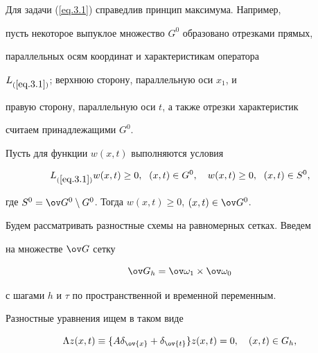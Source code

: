 Для задачи (\ref{eq.3.1}) справедлив принцип максимума. Например,


пусть некоторое выпуклое множество $G^0$ образовано отрезками прямых,


параллельных осям координат и характеристикам оператора


$L_{(\ref{eq.3.1})}$; верхнюю сторону, параллельную оси $x_1$, и


правую сторону, параллельную оси $t$, а также отрезки характеристик


считаем принадлежащими $G^0$.





\begin{lems} \label{l3.1}


Пусть для функции $w(x, t)$ выполняются условия


$$


L_{(\ref{eq.3.1})} w(x, t)\ge 0, \ \; (x, t)\in G^0,\quad


w(x, t)\ge 0, \ \; (x, t)\in S^0,


$$


где $S^0=\ov G^0\setminus G^0$. Тогда $w(x, t)\ge 0$, $(x, t)\in


\ov G^0$.


\end{lems}





Будем рассматривать разностные схемы на равномерных сетках. Введем


на множестве $\ov G$ сетку


\begin{equation}


\label{eq.3.2}


\ov G_h=\ov\omega_1\times \ov\omega_0


\end{equation}


с шагами $h$ и $\tau$ по пространственной и временной переменным.


Разностные уравнения ищем в таком виде


\begin{subequations} \label{eq.3.3}


\begin{equation} \label{eq.3.3a}


\Lambda z(x, t)\equiv \{A \delta_{\ov{x}}+\delta_{\ov{t}}\} z(x,


t)=0, \quad (x, t)\in G_h,


\end{equation}


\end{subequations}


